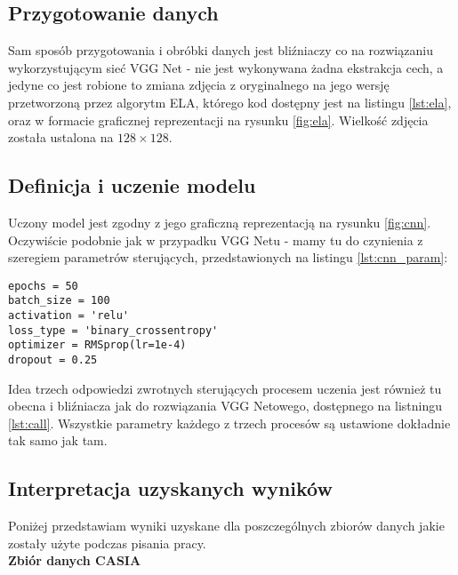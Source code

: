 \subsection{Przygotowanie danych}

Sam sposób przygotowania i obróbki danych jest bliźniaczy co na rozwiązaniu wykorzystującym sieć VGG Net - nie jest wykonywana żadna ekstrakcja cech, a jedyne co jest robione to zmiana zdjęcia z oryginalnego na jego wersję przetworzoną przez algorytm ELA, którego kod dostępny jest na listingu \ref{lst:ela}, oraz w formacie graficznej reprezentacji na rysunku \ref{fig:ela}. Wielkość zdjęcia została ustalona na $128 \times 128$.

\subsection{Definicja i uczenie modelu}

Uczony model jest zgodny z jego graficzną reprezentacją na rysunku \ref{fig:cnn}. Oczywiście podobnie jak w przypadku VGG Netu - mamy tu do czynienia z szeregiem parametrów sterujących, przedstawionych na listingu \ref{lst:cnn_param}:

\begin{lstlisting}[caption={Parametry pracy autorskiego modelu CNN}, label={lst:cnn_param}]
epochs = 50
batch_size = 100
activation = 'relu'
loss_type = 'binary_crossentropy'
optimizer = RMSprop(lr=1e-4)
dropout = 0.25
\end{lstlisting}

Idea trzech odpowiedzi zwrotnych sterujących procesem uczenia jest również tu obecna i bliźniacza jak do rozwiązania VGG Netowego, dostępnego na listningu \ref{lst:call}. Wszystkie parametry każdego z trzech procesów są ustawione dokładnie tak samo jak tam. 

\subsection{Interpretacja uzyskanych wyników}

Poniżej przedstawiam wyniki uzyskane dla poszczególnych zbiorów danych jakie zostały użyte podczas pisania pracy.\\

\textbf{Zbiór danych CASIA} \\

